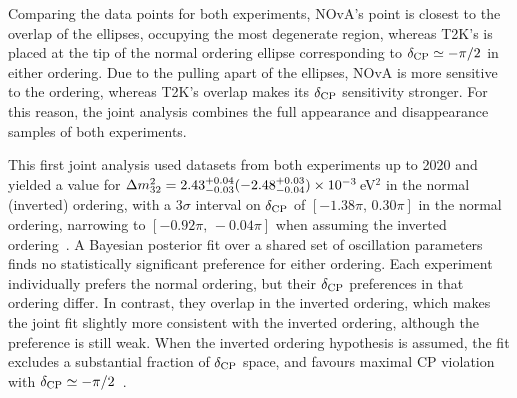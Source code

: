 Comparing the data points for both experiments, NOvA's point is closest to the overlap of the ellipses, occupying the most 
degenerate region, whereas T2K's is placed at the tip of the normal ordering ellipse corresponding to $\delta_{\rm CP}\simeq-\pi/2$ in 
either ordering. Due to the pulling apart of the ellipses, NOvA is more sensitive to the ordering, whereas T2K's overlap makes
its $\delta_{\rm CP}$ sensitivity stronger. For this reason, the joint analysis combines the full appearance and disappearance samples of both experiments.

This first joint analysis used datasets from both experiments up to 2020 and yielded a value for $\Delta m^{2}_{32} = 2.43^{+0.04}_{-0.03}(-2.48^{+0.03}_{-0.04})\times10^{-3}$\,eV$^{2}$ in
the normal (inverted) ordering, with a $3\sigma$ interval on $\delta_{\rm CP}$ of $[-1.38\pi,\,0.30\pi]$ in the normal ordering, narrowing
to $[-0.92\pi,\,-0.04\pi]$ when assuming the inverted ordering~\citep[p.~5]{T2KNOvA2025}.
A Bayesian posterior fit over a shared set of oscillation parameters finds no statistically significant preference for either
ordering. Each experiment individually prefers the normal ordering, but their $\delta_{\rm CP}$ preferences in that ordering differ. In contrast, 
they overlap in the inverted ordering, which makes the joint fit slightly more consistent with the inverted ordering, although
the preference is still weak. When the inverted ordering hypothesis is assumed, the fit excludes a substantial fraction of
$\delta_{\rm CP}$ space, and favours maximal CP violation with $\delta_{\rm CP}\simeq-\pi/2$~\citep[Fig.~3, p.~9]{T2KNOvA2025}.


